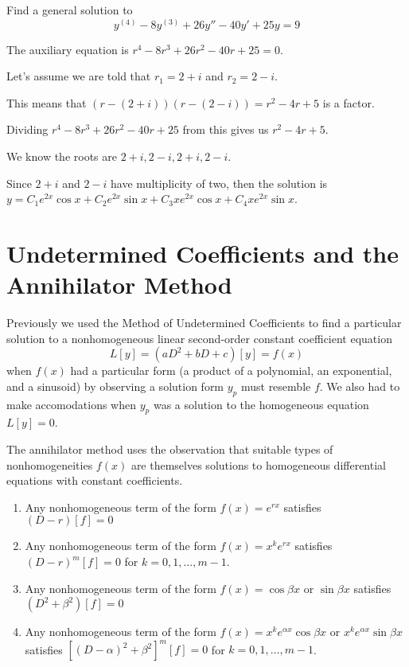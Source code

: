\documentclass[../diffeq.tex]{subfiles}
\begin{document}
\begin{example}
    Find a general solution to 
    \[ y^{(4)}-8y^{(3)}+26y''-40y'+25y=9 \]

    The auxiliary equation is $r^4-8r^3+26r^2-40r+25=0$.

    Let's assume we are told that $r_1=2+i$ and $r_2=2-i$.

    This means that $(r-(2+i))(r-(2-i)) = r^2-4r+5$ is a factor.

    Dividing $r^4-8r^3+26r^2-40r+25$ from this gives us $r^2-4r+5$. 

    We know the roots are $2+i, 2-i, 2+i, 2-i$.

    Since $2+i$ and $2-i$ have multiplicity of two, then the solution is $y=C_1e^{2x}\cos x+C_2e^{2x}\sin x+C_3xe^{2x}\cos x+C_4xe^{2x}\sin x$.
\end{example}

\section{Undetermined Coefficients and the Annihilator Method}
Previously we used the Method of Undetermined Coefficients to find a particular solution to a nonhomogeneous linear second-order constant coefficient equation 
\[ L[y] = (aD^2+bD+c)[y] = f(x) \]
when $f(x)$ had a particular form (a product of a polynomial, an exponential, and a sinusoid) by observing a solution form $y_p$ must resemble $f$. We also had to make accomodations when $y_p$ was a solution to the homogeneous equation $L[y]=0$.

The annihilator method uses the observation that suitable types of nonhomogeneities $f(x)$ are themselves solutions to homogeneous differential equations with constant coefficients.
\begin{enumerate}
    \item Any nonhomogeneous term of the form $f(x)=e^{rx}$ satisfies $(D-r)[f] =0$
    \item Any nonhomogeneous term of the form $f(x)=x^ke^{rx}$ satisfies $(D-r)^m[f]=0$ for $k=0,1,\dots,m-1$.
    \item Any nonhomogeneous term of the form $f(x)=\cos \beta x$ or $\sin\beta x$ satisfies $(D^2+\beta^2)[f]=0$
    \item Any nonhomogeneous term of the form $f(x)=x^ke^{\alpha x}\cos \beta x$ or $x^ke^{\alpha x}\sin \beta x$ satisfies $[(D-\alpha)^2+\beta^2]^m[f]=0$ for $k=0,1,\dots,m-1$.
\end{enumerate}
\end{document}
